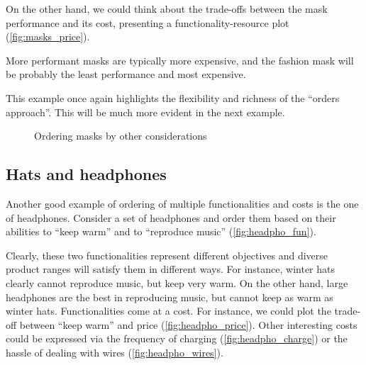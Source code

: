 On the other hand, we could think about the trade-offs between the mask performance and its cost, presenting a functionality-resource plot (\cref{fig:masks_price}).


More performant masks are typically more expensive, and the fashion mask will be probably the least performance and most expensive.

This example once again highlights the flexibility and richness of the ``orders approach''.
This will be much more evident in the next example.

\vfill
\begin{figure*}[h!]
    \caption{Ordering masks by other considerations}
\end{figure*}


\ifextraspace{\vfill\clearpage}

\subsection{Hats and headphones}
Another good example of ordering of multiple functionalities and costs is the one of headphones.
Consider a set of headphones and order them based on their abilities to ``keep warm'' and to ``reproduce music'' (\cref{fig:headpho_fun}).


Clearly, these two functionalities represent different objectives and diverse product ranges will satisfy them in different ways.
For instance, winter hats clearly cannot reproduce music, but keep very warm.
On the other hand, large headphones are the best in reproducing music, but cannot keep as warm as winter hats.
Functionalities come at a cost.
For instance, we could plot the trade-off between ``keep warm'' and price (\cref{fig:headpho_price}).
Other interesting costs could be expressed via the frequency of charging (\cref{fig:headpho_charge}) or the hassle of dealing with wires (\cref{fig:headpho_wires}).

